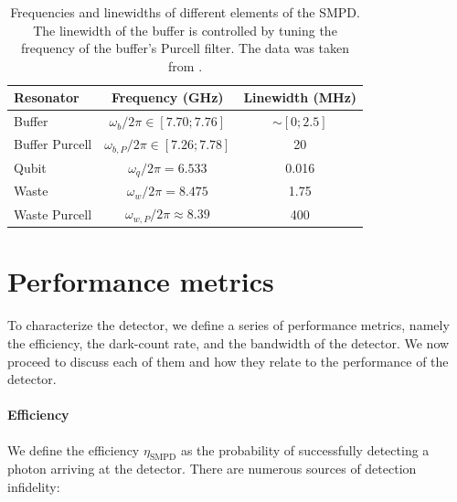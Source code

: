\begin{table}[h!]
\centering
\begin{tabular}{|l|c|c|}
\hline
\textbf{Resonator} & \textbf{Frequency} (GHz) & \textbf{Linewidth} (MHz) \\ \hline
Buffer & $\omega_{b}/2\pi \in [7.70;7.76]$ & $\sim[0;2.5]$ \\ \hline
Buffer Purcell & $\omega_{b, P}/2\pi \in [7.26;7.78]$ & 20 \\ \hline
Qubit & $\omega_{q}/2\pi = 6.533$ & 0.016 \\ \hline
Waste & $\omega_{w}/2\pi = 8.475$ & 1.75 \\ \hline
Waste Purcell & $\omega_{w, P}/2\pi \approx 8.39$ & 400 \\ \hline
\end{tabular}
\caption[SMPD frequencies]{Frequencies and linewidths of different elements of the SMPD. The linewidth of the buffer is controlled by tuning the frequency of the buffer's Purcell filter. The data was taken from \cite{pallegoix_enhancing_2025}.}
\end{table}

\section{Performance metrics}

To characterize the detector, we define a series of performance metrics, namely the efficiency, the dark-count rate, and the bandwidth of the detector. We now proceed to discuss each of them and how they relate to the performance of the detector.

\paragraph{Efficiency}

We define the efficiency $\eta_\text{SMPD}$ as the probability of successfully detecting a photon arriving at the detector. There are numerous sources of detection infidelity:

